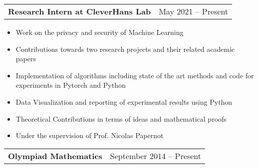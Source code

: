 \documentclass[letterpaper,11pt]{article}
\makeatletter
\newcommand{\resumeItem}[1]{
  \item\small{
    {#1 \vspace{-2pt}}
  }
}
\newcommand{\resumeActivityHeading}[2]{
    \item
    \begin{tabular*}{0.97\textwidth}{l@{\extracolsep{\fill}}r}
      #1 & #2 \\
    \end{tabular*}\vspace{-7pt}
}
\newcommand{\resumeItemListStart}{\begin{itemize}}
\newcommand{\resumeItemListEnd}{\end{itemize}\vspace{-5pt}}
\makeatother
\begin{document}
  \resumeActivityHeading
  {\textbf{Research Intern at CleverHans Lab}}{May 2021 -- Present}

  \resumeItemListStart
        \resumeItem{Work on the privacy and security of Machine Learning}
        \resumeItem{Contributions towards two research projects and their related academic papers}
        \resumeItem{Implementation of algorithms including state of the art methods and code for experiments in Pytorch and Python}
        \resumeItem{Data Visualization and reporting of experimental results using Python}
        \resumeItem{Theoretical Contributions in terms of ideas and mathematical proofs}
        \resumeItem{Under the supervision of Prof. Nicolas Papernot}
  \resumeItemListEnd

    \resumeActivityHeading
    {\textbf{Olympiad Mathematics}}{September 2014 -- Present}
\end{document}
